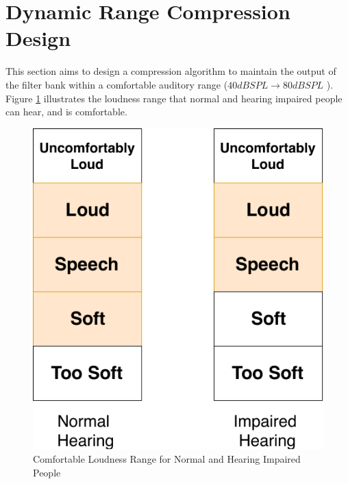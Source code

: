 \documentclass[11pt,onecolumn]{witseiepaper}
\begin{document}
\section{Dynamic Range Compression Design}
\label{sec:dynamicCompress}

\noindent This section aims to design a compression algorithm to maintain the output of the filter bank within a comfortable auditory range ($40dBSPL \rightarrow 80dBSPL$ \cite{widex}). Figure \ref{fig:loud} illustrates the loudness range that normal and hearing impaired people can hear, and is comfortable. 

\begin{figure}[h]
\centering
\includegraphics[width=0.35\linewidth]{loud.pdf}
\caption{Comfortable Loudness Range for Normal and Hearing Impaired People}
\label{fig:loud}
\end{figure} 
\end{document}
